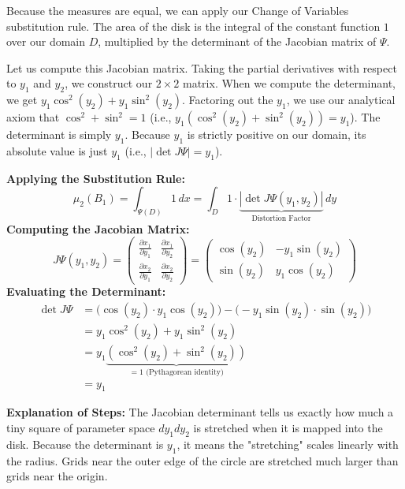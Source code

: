 \begin{spoken_clean}[00:20:17 - 00:22:55]
Because the measures are equal, we can apply our Change of Variables substitution rule. The area of the disk is the integral of the constant function $1$ over our domain $D$, multiplied by the determinant of the Jacobian matrix of $\Psi$. 

Let us compute this Jacobian matrix. Taking the partial derivatives with respect to $y_1$ and $y_2$, we construct our $2 \times 2$ matrix. When we compute the determinant, we get $y_1 \cos^2(y_2) + y_1 \sin^2(y_2)$. Factoring out the $y_1$, we use our analytical axiom that $\cos^2 + \sin^2 = 1$ (i.e., $y_1(\cos^2(y_2) + \sin^2(y_2)) = y_1$). The determinant is simply $y_1$. Because $y_1$ is strictly positive on our domain, its absolute value is just $y_1$ (i.e., $|\det J\Psi| = y_1$).
\end{spoken_clean}


\begin{math_stroke}
\textbf{Applying the Substitution Rule:}
\[
\mu_2(B_1) = \int_{\Psi(D)} 1 \, dx = \int_D 1 \cdot \underbrace{|\det J\Psi(y_1, y_2)|}_{\text{Distortion Factor}} \, dy
\]
\textbf{Computing the Jacobian Matrix:}
\[
J\Psi(y_1, y_2) = \begin{pmatrix} 
\frac{\partial x_1}{\partial y_1} & \frac{\partial x_1}{\partial y_2} \\[6pt]
\frac{\partial x_2}{\partial y_1} & \frac{\partial x_2}{\partial y_2}
\end{pmatrix} = \begin{pmatrix} 
\cos(y_2) & -y_1 \sin(y_2) \\ 
\sin(y_2) & y_1 \cos(y_2) 
\end{pmatrix}
\]
\textbf{Evaluating the Determinant:}
\begin{align*}
\det J\Psi &= \big(\cos(y_2) \cdot y_1 \cos(y_2)\big) - \big(-y_1 \sin(y_2) \cdot \sin(y_2)\big) \\
&= y_1 \cos^2(y_2) + y_1 \sin^2(y_2) \\
&= y_1 \underbrace{(\cos^2(y_2) + \sin^2(y_2))}_{=1 \text{ (Pythagorean identity)}} \\
&= y_1
\end{align*}

\textbf{Explanation of Steps:}
The Jacobian determinant tells us exactly how much a tiny square of parameter space $dy_1 dy_2$ is stretched when it is mapped into the disk. Because the determinant is $y_1$, it means the "stretching" scales linearly with the radius. Grids near the outer edge of the circle are stretched much larger than grids near the origin.
\end{math_stroke}

